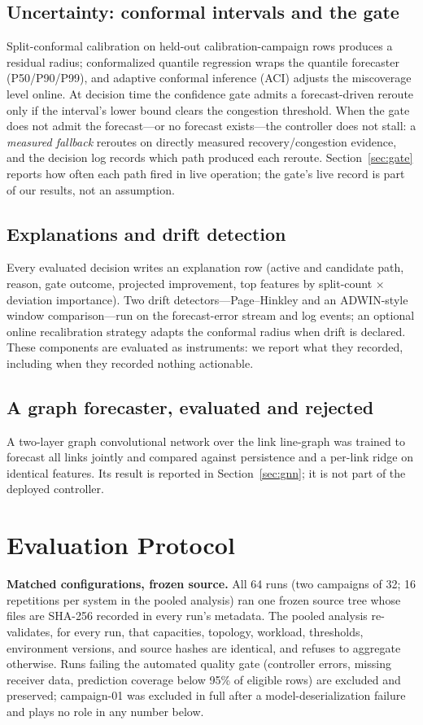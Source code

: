 \documentclass[conference]{IEEEtran}
\begin{document}
\subsection{Uncertainty: conformal intervals and the gate}
Split-conformal calibration on held-out calibration-campaign rows
produces a residual radius; conformalized quantile regression wraps
the quantile forecaster (P50/P90/P99), and adaptive conformal
inference (ACI) adjusts the miscoverage level online. At decision
time the confidence gate admits a forecast-driven reroute only if the
interval's lower bound clears the congestion threshold. When the gate
does not admit the forecast---or no forecast exists---the controller
does not stall: a \emph{measured fallback} reroutes on directly
measured recovery/congestion evidence, and the decision log records
which path produced each reroute. Section~\ref{sec:gate} reports how
often each path fired in live operation; the gate's live record is
part of our results, not an assumption.

\subsection{Explanations and drift detection}
Every evaluated decision writes an explanation row (active and
candidate path, reason, gate outcome, projected improvement, top
features by split-count $\times$ deviation importance). Two drift
detectors---Page--Hinkley and an ADWIN-style window comparison---run
on the forecast-error stream and log events; an optional online
recalibration strategy adapts the conformal radius when drift is
declared. These components are evaluated as instruments: we report
what they recorded, including when they recorded nothing actionable.

\subsection{A graph forecaster, evaluated and rejected}
A two-layer graph convolutional network over the link line-graph was
trained to forecast all links jointly and compared against
persistence and a per-link ridge on identical features. Its result is
reported in Section~\ref{sec:gnn}; it is not part of the deployed
controller.

\section{Evaluation Protocol}
\label{sec:protocol}
\textbf{Matched configurations, frozen source.} All 64 runs (two
campaigns of 32; 16 repetitions per system in the pooled analysis) ran
one frozen source tree whose files are SHA-256 recorded in every
run's metadata. The pooled analysis re-validates, for every run, that
capacities, topology, workload, thresholds, environment versions, and
source hashes are identical, and refuses to aggregate otherwise.
Runs failing the automated quality gate (controller errors, missing
receiver data, prediction coverage below 95\% of eligible rows) are
excluded and preserved; campaign-01 was excluded in full after a
model-deserialization failure and plays no role in any number below.
\end{document}
